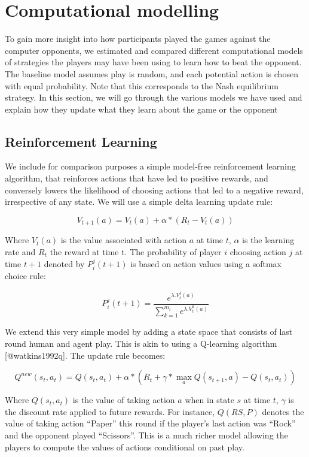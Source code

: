 \documentclass[man,floatsintext]{apa6}
\begin{document}
\newpage

\hypertarget{computational-modelling}{%
\section{Computational modelling}\label{computational-modelling}}

To gain more insight into how participants played the games against the computer opponents, we estimated and compared different computational models of strategies the players may have been using to learn how to beat the opponent. The baseline model assumes play is random, and each potential action is chosen with equal probability. Note that this corresponds to the Nash equilibrium strategy. In this section, we will go through the various models we have used and explain how they update what they learn about the game or the opponent

\hypertarget{reinforcement-learning}{%
\subsection{Reinforcement Learning}\label{reinforcement-learning}}

We include for comparison purposes a simple model-free reinforcement learning algorithm, that reinforces actions that have led to positive rewards, and conversely lowers the likelihood of choosing actions that led to a negative reward, irrespective of any state. We will use a simple delta learning update rule:

\[ V_{t+1}(a) = V_{t}(a) + \alpha*( R_{t}  - V_{t}(a)) \]

Where \(V_{t}(a)\) is the value associated with action \(a\) at time \(t\), \(\alpha\) is the learning rate and \(R_{t}\) the reward at time t. The probability of player \(i\) choosing action \(j\) at time \(t+1\) denoted by \(P_{i}^{j}(t+1)\) is based on action values using a softmax choice rule:

\[P_{i}^{j}(t+1) = \frac{e^{\lambda . V_{t}^{j}(a)}}{\sum_{k=1}^{m_{i}}e^{\lambda . V_{t}^{k}(a)}} \]

We extend this very simple model by adding a state space that consists of last round human and agent play. This is akin to using a Q-learning algorithm {[}@watkins1992q{]}. The update rule becomes:

\[ Q^{new}(s_{t},a_{t}) = Q(s_{t},a_{t}) + \alpha*( R_{t}  + \gamma*\underset{a}{\max}Q(s_{t+1},a) - Q(s_{t},a_{t}) ) \]

Where \(Q(s_{t},a_{t})\) is the value of taking action \(a\) when in state \(s\) at time \(t\), \(\gamma\) is the discount rate applied to future rewards. For instance, \(Q(RS,P)\) denotes the value of taking action \enquote{Paper} this round if the player's last action was \enquote{Rock} and the opponent played \enquote{Scissors}. This is a much richer model allowing the players to compute the values of actions conditional on past play.
\end{document}
